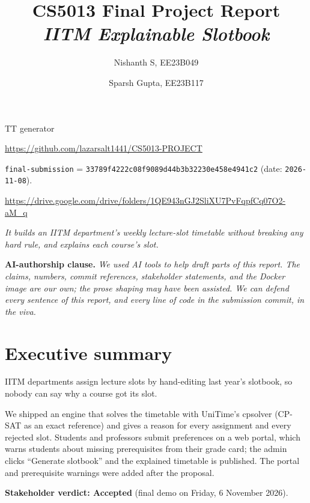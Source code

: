 \documentclass[11pt,a4paper]{article}
\title{CS5013 Final Project Report \\
       \large\textit{IITM Explainable Slotbook}}
\author{Nishanth S, EE23B049 \and Sparsh Gupta, EE23B117}
\date{}
\begin{document}
\maketitle

\vspace{-2.0em}

\begin{description}[leftmargin=!,labelwidth=\widthof{\textbf{Submission commit:}},nosep,font=\bfseries]
  \item[Team Name:]         TT generator
  \item[Repository:]      \url{https://github.com/lazarsalt1441/CS5013-PROJECT}
  \item[Submission commit:] \texttt{final-submission} = \texttt{33789f4222c08f9089d44b3b32230e458e4941c2} (date: \texttt{2026-11-08}).
  \item[Docker image:]    \url{https://drive.google.com/drive/folders/1QE943nGJ2SliXU7PvFqpfCq07O2-aM_q}
  \item[Tagline:]         \textit{It builds an IITM department's weekly lecture-slot timetable without breaking any hard rule, and explains each course's slot.}
\end{description}

\textbf{AI-authorship clause.}
\textit{%
We used AI tools to help draft parts of this report.  The claims,
numbers, commit references, stakeholder statements, and the Docker
image are our own; the prose shaping may have been assisted.  We can
defend every sentence of this report, and every line of code in the
submission commit, in the viva.%
}

\section{Executive summary}

IITM departments assign lecture slots by hand-editing last year's slotbook, so nobody can say why a course got its slot.

We shipped an engine that solves the timetable with UniTime's cpsolver (CP-SAT as an exact reference) and gives a reason for every assignment and every rejected slot. Students and professors submit preferences on a web portal, which warns students about missing prerequisites from their grade card; the admin clicks ``Generate slotbook'' and the explained timetable is published. The portal and prerequisite warnings were added after the proposal.

\textbf{Stakeholder verdict: Accepted} (final demo on Friday, 6 November 2026).
\end{document}
